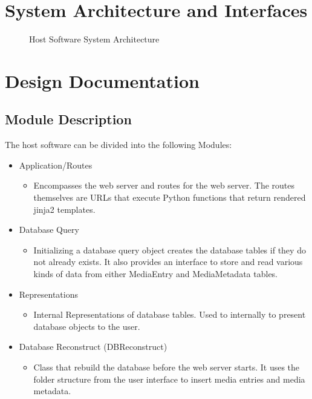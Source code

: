 \documentclass[12pt]{article}
\begin{document}
\section{System Architecture and Interfaces}
\begin{figure}[H]
	\caption{Host Software System Architecture}
\end{figure}
\section{Design Documentation}
\subsection{Module Description}
The host software can be divided into the following Modules:
\begin{itemize}
	\item Application/Routes
	      \begin{itemize}
		      \item Encompasses the web server and routes for the web server. The routes themselves are URLs that execute Python functions that return rendered jinja2 templates.
	      \end{itemize}
	\item Database Query
	      \begin{itemize}
		      \item Initializing a database query object creates the database tables if they do not already exists. It also provides an interface to store and read various kinds of data from either MediaEntry and MediaMetadata tables.
	      \end{itemize}
	\item Representations
	      \begin{itemize}
		      \item Internal Representations of database tables. Used to internally to present database objects to the user.
	      \end{itemize}
	\item Database Reconstruct (DBReconstruct)
	      \begin{itemize}
		      \item Class that rebuild the database before the web server starts. It uses the folder structure from the user interface to insert media entries and media metadata.
	      \end{itemize}
\end{itemize}
\end{document}
